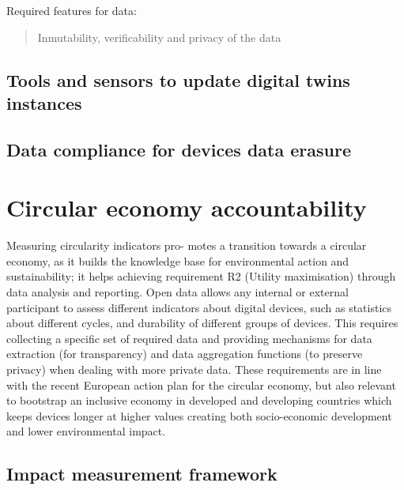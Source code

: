 \documentclass[
]{book}
\begin{document}
Required features for data:

\begin{quote}
Inmutability, verificability and privacy of the data
\end{quote}

\hypertarget{tools-and-sensors-to-update-digital-twins-instances}{%
\subsection{Tools and sensors to update digital twins instances}\label{tools-and-sensors-to-update-digital-twins-instances}}

\hypertarget{data-compliance-for-devices-data-erasure}{%
\subsection{Data compliance for devices data erasure}\label{data-compliance-for-devices-data-erasure}}

\hypertarget{circular-economy-accountability}{%
\section{Circular economy accountability}\label{circular-economy-accountability}}

Measuring circularity indicators pro- motes a transition towards a circular economy, as it builds the knowledge base for environmental action and sustainability; it helps achieving requirement R2 (Utility maximisation) through data analysis and reporting. Open data allows any internal or external participant to assess different indicators about digital devices, such as statistics about different cycles, and durability of different groups of devices. This requires collecting a specific set of required data and providing mechanisms for data extraction (for transparency) and data aggregation functions (to preserve privacy) when dealing with more private data. These requirements are in line with the recent European action plan for the circular economy, but also relevant to bootstrap an inclusive economy in developed and developing countries which keeps devices longer at higher values creating both socio-economic development and lower environmental impact.

\hypertarget{impact-measurement-framework}{%
\subsection{Impact measurement framework}\label{impact-measurement-framework}}
\end{document}
